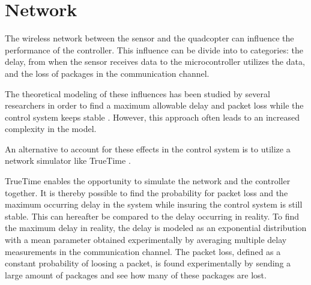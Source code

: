 \section{Network}
The wireless network between the sensor and the quadcopter can influence the performance of the controller. This influence can be divide into to categories: the delay, from when the sensor receives data to the microcontroller utilizes the data, and the loss of packages in the communication channel.


The theoretical modeling of these influences has been studied by several researchers in order to find a maximum allowable delay and packet loss while the control system keeps stable . However, this approach often leads to an increased complexity in the model. 

An alternative to account for these effects in the control system is to utilize a network simulator like TrueTime \cite{TrueTimeNew}.

TrueTime enables the opportunity to simulate the network and the controller together. It is thereby possible to find the probability for packet loss and the maximum occurring delay in the system while insuring the control system is still stable. This can hereafter be compared to the delay occurring in reality. To find the maximum delay in reality, the delay is modeled as an exponential distribution with a mean parameter obtained experimentally by averaging multiple delay measurements in the communication channel. The packet loss, defined as a constant probability of loosing a packet, is found experimentally by sending a large amount of packages and see how many of these packages are lost.  

